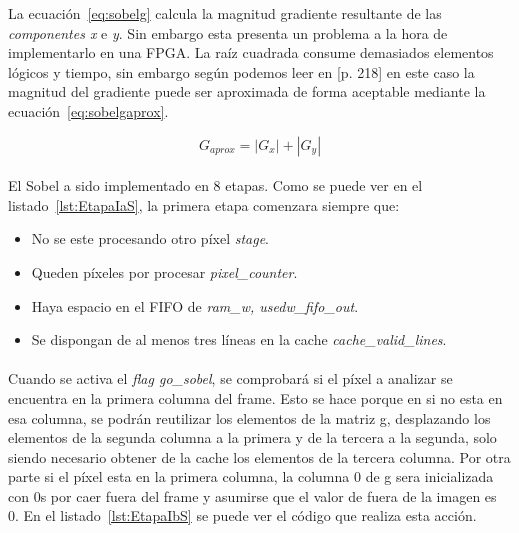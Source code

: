 \documentclass[a4paper,12pt,titlepage,final]{book}
\begin{document}
La ecuación~\ref{eq:sobelg} calcula la magnitud gradiente resultante de las \textit{componentes x} e \textit{y}. Sin embargo esta presenta un problema a la hora de implementarlo en una FPGA. La raíz cuadrada consume demasiados elementos lógicos y tiempo, sin embargo según podemos leer en [p. 218] \citet{Myler} en este caso la magnitud del gradiente puede ser aproximada de forma aceptable mediante la ecuación~\ref{eq:sobelgaprox}.

\begin{equation}\label{eq:sobelgaprox}
G_{aprox}=|G_x| + |G_y|
\end{equation}

\paragraph{}
El Sobel a sido implementado en 8 etapas. Como se puede ver en el listado~\ref{lst:EtapaIaS}, la primera etapa comenzara siempre que:

\begin{itemize}
 \item No se este procesando otro píxel \textit{stage}.
 \item Queden píxeles por procesar \textit{pixel\_counter}.
 \item Haya espacio en el FIFO de \textit{ram\_w, usedw\_fifo\_out}.
 \item Se dispongan de al menos tres líneas en la cache \textit{cache\_valid\_lines}.
\end{itemize}



\paragraph{}
Cuando se activa el \textit{flag go\_sobel}, se comprobará si el píxel a analizar se encuentra en la primera columna del frame. Esto se hace porque en si no esta en esa columna, se podrán reutilizar los elementos de la matriz g, desplazando los elementos de la segunda columna a la primera y de la tercera a la segunda, solo siendo necesario obtener de la cache los elementos de la tercera columna. Por otra parte si el píxel esta en la primera columna, la columna 0 de g sera inicializada con 0s por caer fuera del frame y asumirse que el valor de fuera de la imagen es 0. En el listado~\ref{lst:EtapaIbS} se puede ver el código que realiza esta acción.
\end{document}

